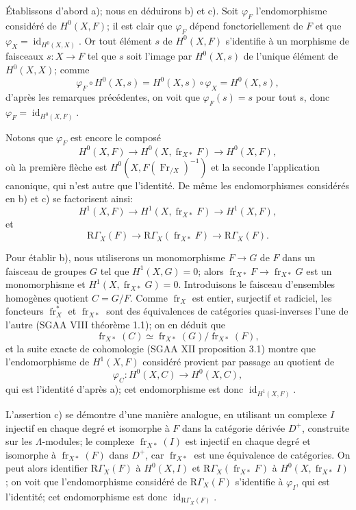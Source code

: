 \documentclass[11pt]{article}
\newcommand{\R}{\mathrm{R}}\newcommand{\RHomCore}{\mathrm{RHom}}
\providecommand{\RGamma}{\R\Gamma}
\providecommand{\id}{\operatorname{id}}
\providecommand{\id}{\operatorname{id}}
\providecommand{\id}{\operatorname{id}}
\providecommand{\RGamma}{\R\Gamma}
\providecommand{\R}{\mathrm R}
\providecommand{\id}{\operatorname{id}}
\providecommand{\id}{\operatorname{id}}
\providecommand{\fr}{\operatorname{fr}}
\providecommand{\Fr}{\operatorname{Fr}}
\providecommand{\Fr}{\operatorname{Fr}}
\providecommand{\fr}{\operatorname{fr}}
\providecommand{\id}{\operatorname{id}}
\providecommand{\RGamma}{\R\Gamma}
\begin{document}
Établissons d'abord a); nous en déduirons b) et c). Soit $\varphi_F$ l'endomorphisme considéré de $H^0(X,F)$; il est clair que $\varphi_F$ dépend fonctoriellement de $F$ et que $\varphi_X=\id_{H^0(X,X)}$. Or tout élément $s$ de $H^0(X,F)$ s'identifie à un morphisme de faisceaux $s:X\to F$ tel que $s$ soit l'image par $H^0(X,s)$ de l'unique élément de $H^0(X,X)$; comme
\[
\varphi_F\circ H^0(X,s)=H^0(X,s)\circ\varphi_X=H^0(X,s),
\]
d'après les remarques précédentes, on voit que $\varphi_F(s)=s$ pour tout $s$, donc $\varphi_F=\id_{H^0(X,F)}$.

Notons que $\varphi_F$ est encore le composé
\[
H^0(X,F)\longrightarrow H^0(X,\fr_{X*}F)
\longrightarrow H^0(X,F),
\]
où la première flèche est $H^0(X,F(\Fr_{/X})^{-1})$ et la seconde l'application canonique, qui n'est autre que l'identité. De même les endomorphismes considérés en b) et c) se factorisent ainsi:
\[
H^1(X,F)\longrightarrow H^1(X,\fr_{X*}F)
\longrightarrow H^1(X,F),
\]
et
\[
\RGamma_X(F)\longrightarrow \RGamma_X(\fr_{X*}F)
\longrightarrow \RGamma_X(F).
\]

Pour établir b), nous utiliserons un monomorphisme $F\to G$ de $F$ dans un faisceau de groupes $G$ tel que $H^1(X,G)=0$; alors $\fr_{X*}F\to\fr_{X*}G$ est un monomorphisme et $H^1(X,\fr_{X*}G)=0$. Introduisons le faisceau d'ensembles homogènes quotient $C=G/F$. Comme $\fr_X$ est entier, surjectif et radiciel, les foncteurs $\fr_X^*$ et $\fr_{X*}$ sont des équivalences de catégories quasi-inverses l'une de l'autre (SGAA VIII théorème 1.1); on en déduit que
\[
\fr_{X*}(C)\simeq\fr_{X*}(G)/\fr_{X*}(F),
\]
et la suite exacte de cohomologie (SGAA XII proposition 3.1) montre que l'endomorphisme de $H^1(X,F)$ considéré provient par passage au quotient de
\[
\varphi_C:H^0(X,C)\longrightarrow H^0(X,C),
\]
qui est l'identité d'après a); cet endomorphisme est donc $\id_{H^1(X,F)}$.

L'assertion c) se démontre d'une manière analogue, en utilisant un complexe $I$ injectif en chaque degré et isomorphe à $F$ dans la catégorie dérivée $D^+$, construite sur les $\Lambda$-modules; le complexe $\fr_{X*}(I)$ est injectif en chaque degré et isomorphe à $\fr_{X*}(F)$ dans $D^+$, car $\fr_{X*}$ est une équivalence de catégories. On peut alors identifier $\RGamma_X(F)$ à $H^0(X,I)$ et $\RGamma_X(\fr_{X*}F)$ à $H^0(X,\fr_{X*}I)$; on voit que l'endomorphisme considéré de $\RGamma_X(F)$ s'identifie à $\varphi_I$, qui est l'identité; cet endomorphisme est donc $\id_{\RGamma_X(F)}$.
\end{document}
